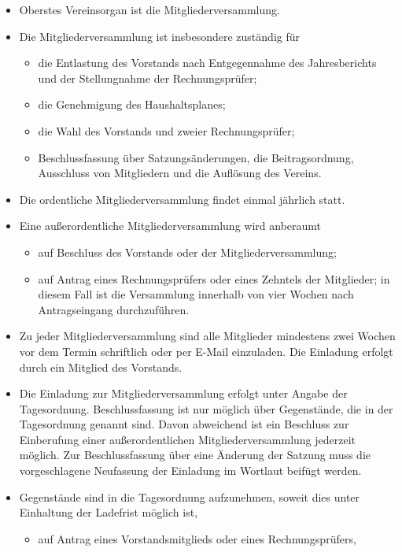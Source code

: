 \documentclass[11pt]{article}
\def\items#1{{%
  \itcounter0%
  \begin{itemize}
  #1
  \end{itemize}
}}
\let\it\item%
\def\item{
  \advance\itcounter1%
  \it[(\the\itcounter)]
}
\begin{document}
\items{
   \item Oberstes Vereinsorgan ist die Mitgliederversammlung.
   \item Die Mitgliederversammlung ist insbesondere zust{\"a}ndig f{\"u}r
     \items{
       \item die Entlastung des Vorstands nach Entgegennahme des Jahresberichts und der
                Stellungnahme der Rechnungspr{\"u}fer;
       \item die Genehmigung des Haushaltsplanes;
       \item die Wahl des Vorstands und zweier Rechnungspr{\"u}fer;
       \item Beschlussfassung {\"u}ber Satzungs{\"a}nderungen, die Beitragsordnung, Ausschluss von
                Mitgliedern und die Aufl{\"o}sung des Vereins.
     }
   \item Die ordentliche Mitgliederversammlung findet einmal j{\"a}hrlich statt.
   \item Eine au{\ss}erordentliche Mitgliederversammlung wird anberaumt
     \items{
       \item auf Beschluss des Vorstands oder der Mitgliederversammlung;
       \item auf Antrag eines Rechnungspr{\"u}fers oder eines
                Zehntels der Mitglieder; in diesem Fall ist die Versammlung innerhalb von
                vier Wochen nach Antragseingang durchzuf{\"u}hren.
     }
   \item Zu jeder Mitgliederversammlung sind alle Mitglieder mindestens zwei Wochen vor
       dem Termin schriftlich oder per E-Mail einzuladen.
       Die Einladung erfolgt durch ein Mitglied des Vorstands.
   \item
       Die Einladung zur Mitgliederversammlung erfolgt unter Angabe der Tagesordnung.
       Beschlussfassung ist nur m{\"o}glich {\"u}ber Gegenst{\"a}nde, die in der Tagesordnung
       genannt sind. Davon abweichend ist ein Beschluss zur Einberufung einer
       au{\ss}erordentlichen Mitgliederversammlung jederzeit m{\"o}glich.
       Zur Beschlussfassung {\"u}ber eine {\"A}nderung der Satzung muss die vorgeschlagene
       Neufassung der Einladung im Wortlaut beif{\"u}gt werden.
    \item 
       Gegenst{\"a}nde sind in die Tagesordnung aufzunehmen, soweit dies unter Einhaltung der
       Ladefrist m{\"o}glich ist,
      \items{
        \item auf Antrag eines Vorstandsmitglieds oder eines Rechnungspr{\"u}fers,
}}
\end{document}
